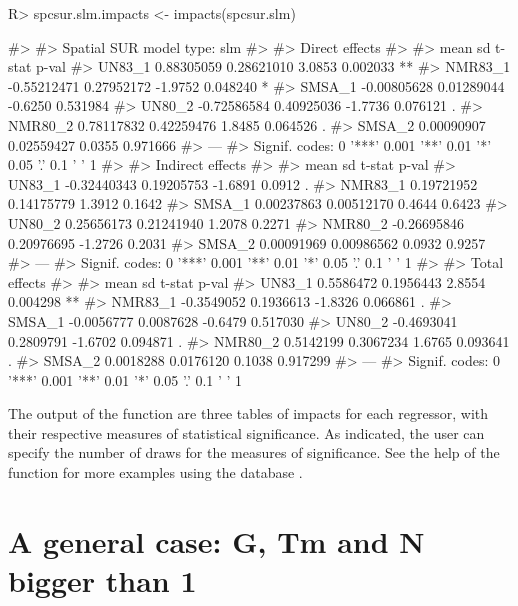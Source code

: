 \documentclass[article]{jss}
\begin{document}
\begin{CodeChunk}

\begin{CodeInput}
R> spcsur.slm.impacts <- impacts(spcsur.slm)
\end{CodeInput}

\begin{CodeOutput}
#> 
#> Spatial SUR model type:  slm 
#> 
#>  Direct effects 
#> 
#>                mean          sd  t-stat    p-val   
#> UN83_1   0.88305059  0.28621010  3.0853 0.002033 **
#> NMR83_1 -0.55212471  0.27952172 -1.9752 0.048240 * 
#> SMSA_1  -0.00805628  0.01289044 -0.6250 0.531984   
#> UN80_2  -0.72586584  0.40925036 -1.7736 0.076121 . 
#> NMR80_2  0.78117832  0.42259476  1.8485 0.064526 . 
#> SMSA_2   0.00090907  0.02559427  0.0355 0.971666   
#> ---
#> Signif. codes:  0 '***' 0.001 '**' 0.01 '*' 0.05 '.' 0.1 ' ' 1
#> 
#>  Indirect effects 
#> 
#>                mean          sd  t-stat  p-val  
#> UN83_1  -0.32440343  0.19205753 -1.6891 0.0912 .
#> NMR83_1  0.19721952  0.14175779  1.3912 0.1642  
#> SMSA_1   0.00237863  0.00512170  0.4644 0.6423  
#> UN80_2   0.25656173  0.21241940  1.2078 0.2271  
#> NMR80_2 -0.26695846  0.20976695 -1.2726 0.2031  
#> SMSA_2   0.00091969  0.00986562  0.0932 0.9257  
#> ---
#> Signif. codes:  0 '***' 0.001 '**' 0.01 '*' 0.05 '.' 0.1 ' ' 1
#> 
#>  Total effects 
#> 
#>               mean         sd  t-stat    p-val   
#> UN83_1   0.5586472  0.1956443  2.8554 0.004298 **
#> NMR83_1 -0.3549052  0.1936613 -1.8326 0.066861 . 
#> SMSA_1  -0.0056777  0.0087628 -0.6479 0.517030   
#> UN80_2  -0.4693041  0.2809791 -1.6702 0.094871 . 
#> NMR80_2  0.5142199  0.3067234  1.6765 0.093641 . 
#> SMSA_2   0.0018288  0.0176120  0.1038 0.917299   
#> ---
#> Signif. codes:  0 '***' 0.001 '**' 0.01 '*' 0.05 '.' 0.1 ' ' 1
\end{CodeOutput}
\end{CodeChunk}

The output of the function are three tables of impacts for each regressor, with their respective measures of statistical significance. As indicated, the user can specify the number of draws for the measures of significance. See the help of the function for more examples using the database .

\hypertarget{general-case}{%
\section{A general case: G, Tm and N bigger than 1}\label{general-case}}
\end{document}
